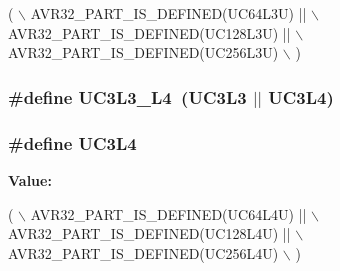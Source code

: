 \begin{DoxyCode}
(   \(\backslash\)
        AVR32\_PART\_IS\_DEFINED(UC64L3U)  || \(\backslash\)
        AVR32\_PART\_IS\_DEFINED(UC128L3U) || \(\backslash\)
        AVR32\_PART\_IS\_DEFINED(UC256L3U) \(\backslash\)
        )
\end{DoxyCode}
\hypertarget{group__uc3__part__macros__group_gae4dccd708991a86a5e8598b0c72d6bbd}{
\subsubsection[{U\-C3\-L3\-\_\-\-L4}]{\setlength{\rightskip}{0pt plus 5cm}\#define U\-C3\-L3\-\_\-\-L4~({\bf U\-C3\-L3} $|$$|$ {\bf U\-C3\-L4})}}\label{group__uc3__part__macros__group_gae4dccd708991a86a5e8598b0c72d6bbd}
\hypertarget{group__uc3__part__macros__group_gae119ee2bcbfe63aa6cb0bc92245943f6}{
\subsubsection[{U\-C3\-L4}]{\setlength{\rightskip}{0pt plus 5cm}\#define U\-C3\-L4}}\label{group__uc3__part__macros__group_gae119ee2bcbfe63aa6cb0bc92245943f6}
{\bfseries Value\-:}
\begin{DoxyCode}
(   \(\backslash\)
        AVR32\_PART\_IS\_DEFINED(UC64L4U)  || \(\backslash\)
        AVR32\_PART\_IS\_DEFINED(UC128L4U) || \(\backslash\)
        AVR32\_PART\_IS\_DEFINED(UC256L4U) \(\backslash\)
        )
\end{DoxyCode}
